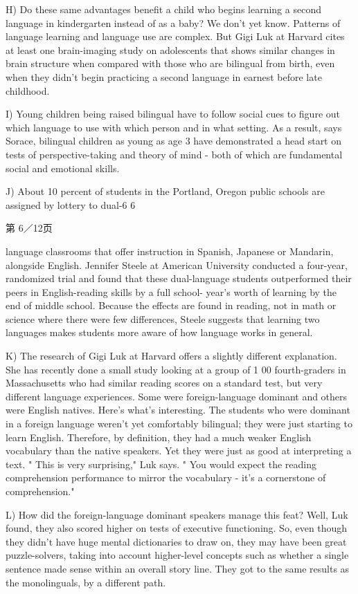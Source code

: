 \documentclass[UTF8,11pt]{ctexart}
\begin{document}
H) Do these same advantages benefit a child who begins learning a second language in kindergarten instead of as a baby? We don't yet know. Patterns of language learning and language use are complex. But Gigi Luk at Harvard cites at least one brain-imaging study on adolescents that shows similar changes in brain structure when compared with those who are bilingual from birth, even when they didn't begin practicing a second language in earnest before late childhood.


I) Young children being raised bilingual have to follow social cues to figure out which language to use with which person and in what setting. As a result, says Sorace, bilingual children as young as age 3 have demonstrated a head start on tests of perspective-taking and theory of mind - both of which are fundamental social and emotional skills.


J) About 10 percent of students in the Portland, Oregon public schools are assigned by lottery to dual-6 \textperiodcentered{} 6


第 6／12页


language classrooms that offer instruction in Spanish, Japanese or Mandarin, alongside English. Jennifer Steele at American University conducted a four-year, randomized trial and found that these dual-language students outperformed their peers in English-reading skills by a full school- year's worth of learning by the end of middle school. Because the effects are found in reading, not in math or science where there were few differences, Steele suggests that learning two languages makes students more aware of how language works in general.


K) The research of Gigi Luk at Harvard offers a slightly different explanation. She has recently done a small study looking at a group of 1 00 fourth-graders in Massachusetts who had similar reading scores on a standard test, but very different language experiences. Some were foreign-language dominant and others were English natives. Here's what's interesting. The students who were dominant in a foreign language weren't yet comfortably bilingual; they were just starting to learn English. Therefore, by definition, they had a much weaker English vocabulary than the native speakers. Yet they were just as good at interpreting a text. " This is very surprising," Luk says. " You would expect the reading comprehension performance to mirror the vocabulary - it's a cornerstone of comprehension."


L) How did the foreign-language dominant speakers manage this feat? Well, Luk found, they also scored higher on tests of executive functioning. So, even though they didn't have huge mental dictionaries to draw on, they may have been great puzzle-solvers, taking into account higher-level concepts such as whether a single sentence made sense within an overall story line. They got to the same results as the monolinguals, by a different path.
\end{document}
